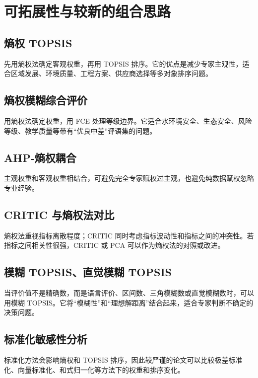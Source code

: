 \documentclass[UTF8,zihao=-4]{ctexart}
\begin{document}
\section{可拓展性与较新的组合思路}
\subsection{熵权 TOPSIS}
先用熵权法确定客观权重，再用 TOPSIS 排序。它的优点是减少专家主观性，适合区域发展、环境质量、工程方案、供应商选择等多对象排序问题。

\subsection{熵权模糊综合评价}
用熵权法确定权重，用 FCE 处理等级边界。它适合水环境安全、生态安全、风险等级、教学质量等带有“优良中差”评语集的问题。

\subsection{AHP-熵权耦合}
主观权重和客观权重相结合，可避免完全专家赋权过主观，也避免纯数据赋权忽略专业经验。

\subsection{CRITIC 与熵权法对比}
熵权法重视指标离散程度；CRITIC 同时考虑指标波动性和指标之间的冲突性。若指标之间相关性很强，CRITIC 或 PCA 可以作为熵权法的对照或改进。

\subsection{模糊 TOPSIS、直觉模糊 TOPSIS}
当评价值不是精确数，而是语言评价、区间数、三角模糊数或直觉模糊数时，可以用模糊 TOPSIS。它将“模糊性”和“理想解距离”结合起来，适合专家判断不确定的决策问题。

\subsection{标准化敏感性分析}
标准化方法会影响熵权和 TOPSIS 排序，因此较严谨的论文可以比较极差标准化、向量标准化、和式归一化等方法下的权重和排序变化。
\end{document}
